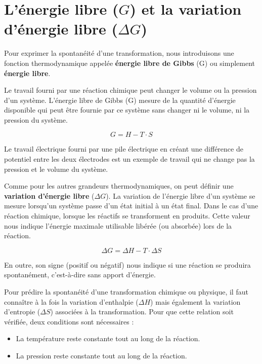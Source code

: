 \documentclass[
  11pt,
  a4paper,
  openany]{book}
\providecommand{\tightlist}{%
  \setlength{\itemsep}{0pt}\setlength{\parskip}{0pt}}
\begin{document}
\hypertarget{luxe9nergie-libre-g-et-la-variation-duxe9nergie-libre-delta-g}{%
\section{\texorpdfstring{L'énergie libre (\(G\)) et la variation d'énergie libre (\(\Delta G\))}{L'énergie libre (G) et la variation d'énergie libre (\textbackslash Delta G)}}\label{luxe9nergie-libre-g-et-la-variation-duxe9nergie-libre-delta-g}}

Pour exprimer la spontanéité d'une transformation, nous introduisons une fonction thermodynamique appelée \textbf{énergie libre de Gibbs} (G) ou simplement \textbf{énergie libre}.

Le travail fourni par une réaction chimique peut changer le volume ou la pression d'un système. L'énergie libre de Gibbs (G) mesure de la quantité d'énergie disponible qui peut être fournie par ce système sans changer ni le volume, ni la pression du système.

\[
G = H - T \cdot S
\]

Le travail électrique fourni par une pile électrique en créant une différence de potentiel entre les deux électrodes est un exemple de travail qui ne change pas la pression et le volume du système.

Comme pour les autres grandeurs thermodynamiques, on peut définir une \textbf{variation d'énergie libre} (\(\Delta G\)). La variation de l'énergie libre d'un système se mesure lorsqu'un système passe d'un état initial à un état final. Dans le cas d'une réaction chimique, lorsque les réactifs se transforment en produits. Cette valeur nous indique l'énergie maximale utilisable libérée (ou absorbée) lors de la réaction.

\[
\Delta G = \Delta H - T \cdot \Delta S
\]

En outre, son signe (positif ou négatif) nous indique si une réaction se produira spontanément, c'est-à-dire sans apport d'énergie.

\clearpage

Pour prédire la spontanéité d'une transformation chimique ou physique, il faut connaître à la fois la variation d'enthalpie (\(\Delta H\)) mais également la variation d'entropie (\(\Delta S\)) associées à la transformation. Pour que cette relation soit vérifiée, deux conditions sont nécessaires :

\begin{itemize}
\tightlist
\item
  La température reste constante tout au long de la réaction.
\item
  La pression reste constante tout au long de la réaction.
\end{itemize}
\end{document}
